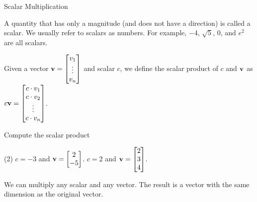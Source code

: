 \documentclass[xcolor=dvipsnames,aspectratio=169,t]{beamer}
\begin{document}
\begin{frame}{Scalar Multiplication}

A quantity that has only a magnitude (and does not have a direction) is called a \alert{scalar}. We usually refer to scalars as numbers. For example, $-4$, $\sqrt{5}$, $0$, and $e^2$ are all scalars.

{\small  
  Given a vector $\mathbf{v} = \begin{bmatrix} v_1\\ \vdots \\ v_n \end{bmatrix}$ and scalar $c$, we define the \alert{scalar product} of $c$ and $\mathbf{v}$ as $c \mathbf{v} = \begin{bmatrix} c \cdot v_1 \\ c \cdot v_2 \\ \vdots \\ c \cdot  v_n \end{bmatrix}$. }

  \pause
  \begin{example}
  Compute the scalar product
    \begin{tasks}(2)
    \task $c = -3$ and $\mathbf{v} = \begin{bmatrix} 2 \\ -5 \end{bmatrix}$. 
    \task $c = 2$ and $\mathbf{v} = \begin{bmatrix} 2 \\ 3 \\ 4 \end{bmatrix}$.
    \end{tasks}
  \end{example}

  \vfill
     
  \pause
  \bi
    \ii We can multiply any scalar and any vector.
    \ii The result is a vector with the same dimension as the original vector.
  \ei
\end{frame}
\end{document}
